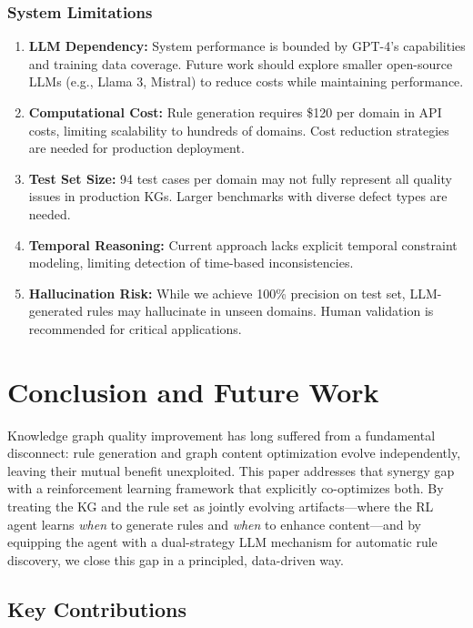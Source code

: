 \documentclass[runningheads]{llncs}
\begin{document}
\subsubsection{System Limitations}

\begin{enumerate}
    \item \textbf{LLM Dependency:} System performance is bounded by GPT-4's capabilities and training data coverage. Future work should explore smaller open-source LLMs (e.g., Llama 3, Mistral) to reduce costs while maintaining performance.
    \item \textbf{Computational Cost:} Rule generation requires \$120 per domain in API costs, limiting scalability to hundreds of domains. Cost reduction strategies are needed for production deployment.
    \item \textbf{Test Set Size:} 94 test cases per domain may not fully represent all quality issues in production KGs. Larger benchmarks with diverse defect types are needed.
    \item \textbf{Temporal Reasoning:} Current approach lacks explicit temporal constraint modeling, limiting detection of time-based inconsistencies.
    \item \textbf{Hallucination Risk:} While we achieve 100\% precision on test set, LLM-generated rules may hallucinate in unseen domains. Human validation is recommended for critical applications.
\end{enumerate}

\section{Conclusion and Future Work}

Knowledge graph quality improvement has long suffered from a fundamental disconnect: rule generation and graph content optimization evolve independently, leaving their mutual benefit unexploited. This paper addresses that synergy gap with a reinforcement learning framework that explicitly co-optimizes both. By treating the KG and the rule set as jointly evolving artifacts—where the RL agent learns \textit{when} to generate rules and \textit{when} to enhance content—and by equipping the agent with a dual-strategy LLM mechanism for automatic rule discovery, we close this gap in a principled, data-driven way.

\subsection{Key Contributions}
\end{document}

